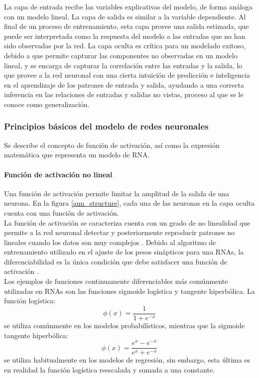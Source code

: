 La capa de entrada recibe las variables explicativas del modelo, de forma análoga con un modelo lineal. La capa de salida es similar a la variable dependiente. Al final de un proceso de entrenamiento, esta capa provee una salida estimada, que puede ser interpretada como la respuesta del modelo a las entradas que no han sido observadas por la red. La capa oculta es crítica para un modelado exitoso, debido a que permite capturar las componentes no observadas en un modelo lineal, y se encarga de capturar la correlación entre las entradas y la salida, lo que provee a la red neuronal con una cierta intuición de predicción e inteligencia en el aprendizaje de los patrones de entrada y salida, ayudando a una correcta inferencia en las relaciones de entradas y salidas no vistas, proceso al que se le conoce como generalización. \parencite{sunythesis} 


\subsubsection{Principios básicos del modelo de redes neuronales}

Se describe el concepto de función de activación, así como la expresión matemática que representa un modelo de RNA.

\paragraph{Función de activación no lineal}
Una función de activación permite limitar la amplitud de la salida de una neurona. En la figura \ref{ann_structure}, cada una de las neuronas en la capa oculta cuenta con una función de activación.\\

La función de activación se caracteriza cuenta con un grado de no linealidad que permite a la red neuronal detectar y posteriormente reproducir patrones no lineales cuando los datos son muy complejos \parencite{sunythesis}. Debido al algoritmo de entrenamiento utilizado en el ajuste de los pesos sinápticos para una RNAs, la diferenciabilidad es la única condición que debe satisfacer una función de activación \parencite{haykin1999neural}.\\

Los ejemplos de funciones continuamente diferenciables más comúnmente utilizadas en RNAs son las funciones sigmoide logística y tangente hiperbólica. La función logística: \[ \phi(x) = \frac{1}{1 + e^{-x}} \] se utiliza comúnmente en los modelos probabilísticos, mientras que la sigmoide tangente hiperbólica: \[ \phi(x) = \frac{e^x - e^{-x}}{e^x + e^{-x}} \] se utiliza habitualmente en los modelos de regresión, sin embargo, esta última es en realidad la función logística reescalada y sumada a una constante.


